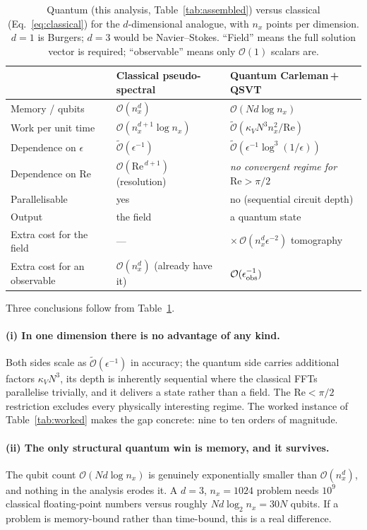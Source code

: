 \documentclass[11pt,a4paper]{article}
\theoremstyle{plain}
\theoremstyle{definition}
\theoremstyle{remark}
\newcommand{\Rey}{\mathrm{Re}}
\newcommand{\Oh}{\mathcal{O}}
\newcommand{\Ot}{\widetilde{\mathcal{O}}}
\begin{document}
\begin{table}[htbp]
\centering
\caption{Quantum (this analysis, Table~\ref{tab:assembled}) versus classical
(Eq.~\eqref{eq:classical}) for the $d$-dimensional analogue, with $n_x$ points
per dimension.  $d=1$ is Burgers; $d=3$ would be Navier--Stokes.  ``Field''
means the full solution vector is required; ``observable'' means only
$\Oh(1)$ scalars are.}
\label{tab:sidebyside}
\small
\begin{tabular}{@{}lll@{}}
\toprule
& Classical pseudo-spectral & Quantum Carleman\,+\,QSVT\\
\midrule
Memory / qubits & $\Oh(n_x^{d})$ & $\Oh(Nd\log n_x)$ \\
Work per unit time & $\Oh(n_x^{d+1}\log n_x)$ & $\Ot(\kappa_V N^{3}n_x^{2}/\Rey)$\\
Dependence on $\epsilon$ & $\Ot(\epsilon^{-1})$ & $\Ot(\epsilon^{-1}\log^{3}(1/\epsilon))$\\
Dependence on $\Rey$ & $\Oh(\Rey^{\,d+1})$ (resolution) & \emph{no convergent regime for} $\Rey>\pi/2$\\
Parallelisable & yes & no (sequential circuit depth)\\
Output & the field & a quantum state\\
Extra cost for the field & --- & $\times\,\Oh(n_x^{d}\epsilon^{-2})$ tomography\\
Extra cost for an observable & $\Oh(n_x^d)$ (already have it) & $\Oh(\epsilon_{\rm obs}^{-1})$\\
\bottomrule
\end{tabular}
\end{table}

Three conclusions follow from Table~\ref{tab:sidebyside}.

\paragraph{(i) In one dimension there is no advantage of any kind.}  Both sides
scale as $\Ot(\epsilon^{-1})$ in accuracy; the quantum side carries additional
factors $\kappa_V N^{3}$, its depth is inherently sequential where the classical
FFTs parallelise trivially, and it delivers a state rather than a field.  The
$\Rey<\pi/2$ restriction excludes every physically interesting regime.  The
worked instance of Table~\ref{tab:worked} makes the gap concrete: nine to ten
orders of magnitude.

\paragraph{(ii) The only structural quantum win is memory, and it survives.}
The qubit count $\Oh(Nd\log n_x)$ is genuinely exponentially smaller than
$\Oh(n_x^d)$, and nothing in the analysis erodes it.  A $d=3$, $n_x=1024$
problem needs $10^9$ classical floating-point numbers versus roughly
$Nd\log_2n_x=30N$ qubits.  If a problem is memory-bound rather than time-bound,
this is a real difference.
\end{document}
